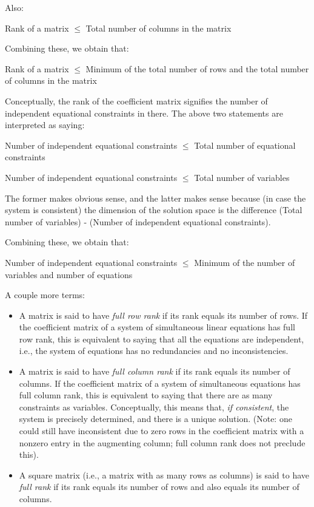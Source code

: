 \documentclass[10pt]{amsart}
\begin{document}
Also:

Rank of a matrix $\le$ Total number of columns in the matrix

Combining these, we obtain that:

Rank of a matrix $\le$ Minimum of the total number of rows and the
total number of columns in the matrix

Conceptually, the rank of the coefficient matrix signifies the number
of independent equational constraints in there. The above two
statements are interpreted as saying:

Number of independent equational constraints $\le$ Total number of
equational constraints

Number of independent equational constraints $\le$ Total number of
variables

The former makes obvious sense, and the latter makes sense because (in
case the system is consistent) the dimension of the solution space is
the difference (Total number of variables) - (Number of independent
equational constraints).

Combining these, we obtain that:

Number of independent equational constraints $\le$ Minimum of the
number of variables and number of equations

A couple more terms:

\begin{itemize}
\item A matrix is said to have {\em full row rank} if its rank equals
  its number of rows. If the coefficient matrix of a system of
  simultaneous linear equations has full row rank, this is equivalent
  to saying that all the equations are independent, i.e., the system
  of equations has no redundancies and no inconsistencies.
\item A matrix is said to have {\em full column rank} if its rank
  equals its number of columns. If the coefficient matrix of a system
  of simultaneous equations has full column rank, this is equivalent
  to saying that there are as many constraints as
  variables. Conceptually, this means that, {\em if consistent}, the
  system is precisely determined, and there is a unique
  solution. (Note: one could still have inconsistent due to zero rows
  in the coefficient matrix with a nonzero entry in the augmenting
  column; full column rank does not preclude this).
\item A square matrix (i.e., a matrix with as many rows as columns) is
  said to have {\em full rank} if its rank equals its number of rows
  and also equals its number of columns.
\end{itemize}
\end{document}
